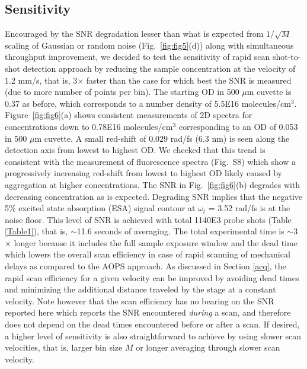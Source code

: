 \documentclass[%
aip,
amsmath,amssymb,
preprint,%
]{revtex4-2}
\newcommand*{\si}[1]{\textcolor{black}{ #1}}
\begin{document}
\subsection{Sensitivity}\label{sensitivity}

Encouraged by the SNR degradation lesser than what is expected from $1/\sqrt{M}$ scaling of Gaussian or random noise (Fig.~\ref{fig:fig5}(d)) along with simultaneous throughput improvement, we decided to test the sensitivity of rapid scan shot-to-shot detection approach by reducing the sample concentration at the velocity of 1.2 mm/s, that is, 3$\times$ faster than the case for which best the SNR is measured (due to more number of points per bin). The starting OD in 500 $\mu$m cuvette is 0.37 as before, which corresponds to a number density of 5.5E16 molecules/cm$^3$. Figure~\ref{fig:fig6}(a) shows consistent measurements of 2D spectra for concentrations down to 0.78E16 molecules/cm$^3$ corresponding to an OD of 0.053 in 500 $\mu$m cuvette. A small red-shift of $0.029$ rad/fs (6.3 nm) is seen along the detection axis from lowest to highest OD. We checked that this trend is consistent with the measurement of fluorescence spectra (Fig.~S8) which show a progressively increasing red-shift from lowest to highest OD likely caused by aggregation at higher concentrations. The SNR in Fig.~\ref{fig:fig6}(b) degrades with decreasing concentration as is expected. Degrading SNR implies that the negative 5\% excited state absorption (ESA) signal contour at $\omega_t$ = 3.52 rad/fs is at the noise floor. This level of SNR is achieved with total 1140E3 probe shots (Table \ref{Table1}), that is, $\sim$11.6 seconds of averaging. The total experimental time is $\sim$3$\times$ longer because it includes the full sample exposure window and the dead time which lowers the overall scan efficiency\cite{Bhat2023} in case of rapid scanning of mechanical delays as compared to the AOPS approach. As discussed in Section \ref{acq}, the rapid scan efficiency for a given velocity can be improved by avoiding dead times and minimizing the additional distance traveled by the stage at a constant velocity. Note however that the scan efficiency has no bearing on the SNR reported here which reports the SNR encountered \textit{during} a scan, and therefore does not depend on the dead times encountered before or after a scan. If desired, a higher level of sensitivity is also straightforward to achieve by using slower scan velocities, that is, larger bin size $M$ or longer averaging through slower scan velocity.\\
\end{document}
